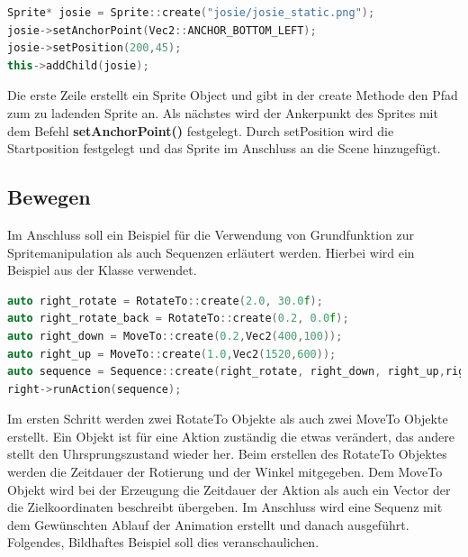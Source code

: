 \begin{lstlisting}[label=lst:sprite_ancerpoint,
				   language=C++,
				   firstnumber=54,
				   caption=Sprite laden ( TutorialScene.cpp )]
Sprite* josie = Sprite::create("josie/josie_static.png");
josie->setAnchorPoint(Vec2::ANCHOR_BOTTOM_LEFT);
josie->setPosition(200,45);
this->addChild(josie);
\end{lstlisting}

Die erste Zeile erstellt ein Sprite Object und gibt in der create Methode den Pfad zum zu ladenden Sprite an. Als nächstes wird der Ankerpunkt des Sprites mit dem Befehl \textbf{setAnchorPoint()} festgelegt. Durch setPosition wird die Startposition festgelegt und das Sprite im Anschluss an die Scene hinzugefügt. 

\subsection{Bewegen}

Im Anschluss soll ein Beispiel für die Verwendung von Grundfunktion zur Spritemanipulation als auch Sequenzen erläutert werden. Hierbei wird ein Beispiel aus der Klasse  verwendet.

\begin{lstlisting}[label=lst:boss_attack_sequence,
				   language=C++,
				   firstnumber=219,
				   caption=Sequence erstellen ( BossLevel.cpp )]
auto right_rotate = RotateTo::create(2.0, 30.0f);
auto right_rotate_back = RotateTo::create(0.2, 0.0f);
auto right_down = MoveTo::create(0.2,Vec2(400,100));
auto right_up = MoveTo::create(1.0,Vec2(1520,600));
auto sequence = Sequence::create(right_rotate, right_down, right_up,right_rotate_back, nullptr);
right->runAction(sequence);
\end{lstlisting}

Im ersten Schritt werden zwei RotateTo Objekte als auch zwei MoveTo Objekte erstellt. Ein Objekt ist für eine Aktion zuständig die etwas verändert, das andere stellt den Uhrsprungszustand wieder her. Beim erstellen des RotateTo Objektes werden die Zeitdauer der Rotierung und der Winkel mitgegeben. Dem MoveTo Objekt wird bei der Erzeugung die Zeitdauer der Aktion als auch ein Vector der die Zielkoordinaten beschreibt übergeben. Im Anschluss wird eine Sequenz mit dem Gewünschten Ablauf der Animation erstellt und danach ausgeführt. Folgendes, Bildhaftes Beispiel soll dies veranschaulichen. 

